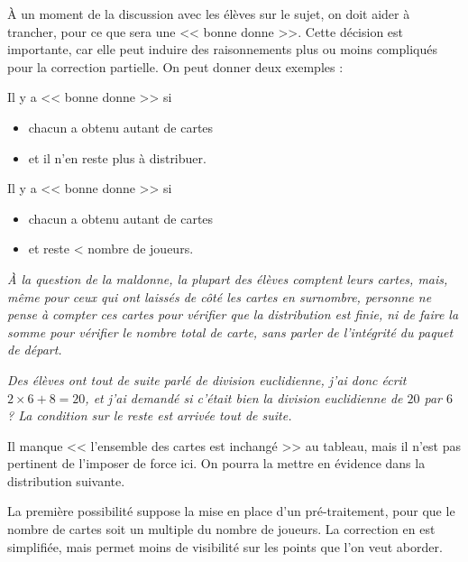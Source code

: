 À un moment de la discussion avec les élèves sur le sujet, on doit aider à trancher, pour ce que sera une << bonne donne >>.
Cette décision est importante, car elle peut induire des raisonnements plus ou moins compliqués pour la correction partielle. On peut donner deux exemples :

\begin{multicols}{2}

\begin{exemple}[title = Au tableau]{}{}
Il y a << bonne donne >> si 
\begin{itemize}[leftmargin=*,label=$\star$]
    \item chacun a obtenu autant de cartes
    \item et il n'en reste plus à distribuer.
\end{itemize} 
\end{exemple}

\columnbreak

\begin{exemple}[title = Au tableau]{}{}
Il y a << bonne donne >> si 
\begin{itemize}[leftmargin=*,label=$\star$]
    \item chacun a obtenu autant de cartes
    \item et reste < nombre de joueurs.
\end{itemize} 
\end{exemple}

\end{multicols}

\textit{À la question de la maldonne, la plupart des élèves comptent leurs cartes, mais, même pour ceux qui ont laissés de côté les cartes en surnombre, personne ne pense à compter ces cartes pour vérifier que la distribution est finie, ni de faire la somme pour vérifier le nombre total de carte, sans parler de l'intégrité du paquet de départ.}

\textit{Des élèves ont tout de suite parlé de division euclidienne, j'ai donc écrit $2\times6+8=20$, et j'ai demandé si c'était bien la division euclidienne de $20$ par $6$ ?  La condition sur le reste est arrivée tout de suite.}

Il manque << l'ensemble des cartes est inchangé >> au tableau, mais il n'est pas pertinent de l'imposer de force ici. On pourra la mettre en évidence dans la distribution suivante. 

La première possibilité suppose la mise en place d'un pré-traitement, pour que le nombre de cartes soit un multiple du nombre de joueurs. La correction en est simplifiée, mais permet moins de visibilité sur les points que l'on veut aborder.

